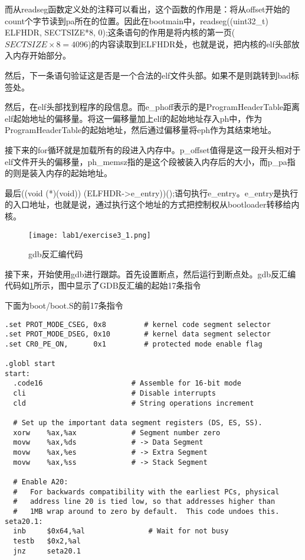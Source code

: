 \begin{exerciseSolution}{3}
\par 而从readseg函数定义处的注释可以看出，这个函数的作用是：将从offset开始的count个字节读到pa所在的位置。因此在bootmain中，readseg((uint32\_t) ELFHDR, SECTSIZE*8, 0);这条语句的作用是将内核的第一页($SECTSIZE\times 8 = 4096$)的内容读取到ELFHDR处，也就是说，把内核的elf头部放入内存开始部分。
\par 然后，下一条语句验证这是否是一个合法的elf文件头部。如果不是则跳转到bad标签处。
\par 然后，在elf头部找到程序的段信息。而e\_phoff表示的是ProgramHeaderTable距离elf起始地址的偏移量。将这一偏移量加上elf的起始地址存入ph中，作为ProgramHeaderTable的起始地址，然后通过偏移量将eph作为其结束地址。
\par 接下来的for循环就是加载所有的段进入内存中。p\_offset值得是这一段开头相对于elf文件开头的偏移量，ph\_memsz指的是这个段被装入内存后的大小，而p\_pa指的则是装入内存的起始地址。
\par 最后((void (*)(void)) (ELFHDR->e\_entry))();语句执行e\_entry。e\_entry是执行的入口地址，也就是说，通过执行这个地址的方式把控制权从bootloader转移给内核。

\begin{figure}[htb]
    \centering
    \texttt{[image: lab1/exercise3\_1.png]}
    \caption{gdb反汇编代码}
    \label{fig:exercise3_1}
\end{figure}
\par 接下来，开始使用gdb进行跟踪。首先设置断点，然后运行到断点处。gdb反汇编代码如\ref{fig:exercise3_1}所示，图中显示了GDB反汇编的起始17条指令

\FloatBarrier
\par 下面为boot/boot.S的前17条指令
\begin{lstlisting}
.set PROT_MODE_CSEG, 0x8         # kernel code segment selector
.set PROT_MODE_DSEG, 0x10        # kernel data segment selector
.set CR0_PE_ON,      0x1         # protected mode enable flag

.globl start
start:
  .code16                     # Assemble for 16-bit mode
  cli                         # Disable interrupts
  cld                         # String operations increment

  # Set up the important data segment registers (DS, ES, SS).
  xorw    %ax,%ax             # Segment number zero
  movw    %ax,%ds             # -> Data Segment
  movw    %ax,%es             # -> Extra Segment
  movw    %ax,%ss             # -> Stack Segment

  # Enable A20:
  #   For backwards compatibility with the earliest PCs, physical
  #   address line 20 is tied low, so that addresses higher than
  #   1MB wrap around to zero by default.  This code undoes this.
seta20.1:
  inb     $0x64,%al               # Wait for not busy
  testb   $0x2,%al
  jnz     seta20.1


\end{lstlisting}
\end{exerciseSolution}
